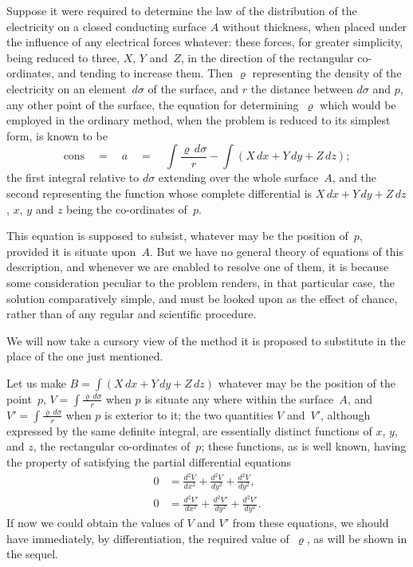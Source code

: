 \documentclass[12pt,notitlepage]{amsart}
\renewcommand{\rho}{\varrho}
\begin{document}
Suppose it were required to determine the law of the distribution of
the electricity on a closed conducting surface $A$ without thickness,
when placed
under the influence of any electrical forces whatever: these forces, for greater
simplicity, being reduced to three, $X$, $Y$ and~$Z$,
in the direction of the rectangular co-ordinates,
and tending to increase them. Then $\rho$ representing the
density of the electricity on an element~$d\sigma$ of the surface,
and $r$ the distance
between $d\sigma$ and $p$, any other point of the surface,
the equation for determining~$\rho$
which would be employed in the ordinary method, when the problem
is reduced to its simplest form, is known to be
\[
\tag{$a$}
\text{cons}\quad=\quad a\quad=\quad
\int\frac{\rho\,d\sigma}{r}-\int(X\,dx+Y\,dy+Z\,dz);
\]
the first integral relative to $d\sigma$
extending over the whole surface~$A$, and the second
representing the function whose complete differential is
${X\,dx+Y\,dy+Z\,dz}$, $x$, $y$ and $z$ being the co-ordinates of~$p$.

This equation is supposed to subsist, whatever may be the position of~$p$,
provided it is situate upon~$A$. But we have no general theory of equations
of this description, and whenever we are enabled to resolve one of them, it
is because some consideration peculiar to the problem renders, in that 
particular case, the solution comparatively simple,
and must be looked upon as the
effect of chance, rather than of any regular and scientific procedure.

We will now take a cursory view of the method it is proposed to
substitute in the place of the one just mentioned.

Let us make $B=\int(X\,dx+Y\,dy+Z\,dz)$ whatever may be the position
of the point~$p$, $V=\int\frac{\rho\,d\sigma}{r}$
when $p$ is situate any where within the surface~$A$,
and $V'=\int\frac{\rho\,d\sigma}{r}$ when $p$ is
exterior to it; the two quantities $V$ and~$V'$,
although expressed by the same definite integral,
are essentially distinct functions
of $x$, $y$, and $z$, the rectangular co-ordinates of~$p$;
these functions, as is well
known, having the property of satisfying the partial differential equations
\[
\begin{aligned}
0 &= \frac{d^2V}{dx^2}+\frac{d^2V}{dy^2}+\frac{d^2V}{dy^2},\\
0 &= \frac{d^2V'}{dx^2}+\frac{d^2V'}{dy^2}+\frac{d^2V'}{dy^2}.
\end{aligned}
\]
If now we could obtain the values of $V$ and $V'$ from these equations, we
should have immediately, by differentiation, the required value
of~$\rho$, as will
be shown in the sequel.
\end{document}
